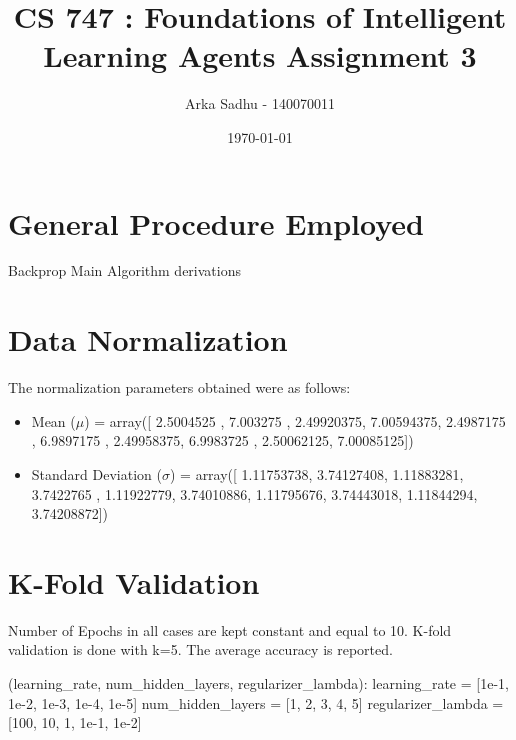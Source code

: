 \documentclass{article}
\title{CS 747 : Foundations of Intelligent Learning Agents Assignment 3}
\author{Arka Sadhu - 140070011}
\date{\today}
\begin{document}
\maketitle

\section{General Procedure Employed}
Backprop Main Algorithm derivations

\section{Data Normalization}
The normalization parameters obtained were as follows:
\begin{itemize}
\item Mean ($\mu$) = array([ 2.5004525 ,  7.003275  ,  2.49920375,  7.00594375,  2.4987175 , 6.9897175 ,  2.49958375,  6.9983725 ,  2.50062125,  7.00085125])
\item Standard Deviation ($\sigma$) = array([ 1.11753738,  3.74127408,  1.11883281,  3.7422765 ,  1.11922779,
  3.74010886,  1.11795676,  3.74443018,  1.11844294,  3.74208872])
\end{itemize}

\section{K-Fold Validation}
Number of Epochs in all cases are kept constant and equal to 10.
K-fold validation is done with k=5.
The average accuracy is reported.

(learning_rate, num_hidden_layers, regularizer_lambda):
learning_rate = [1e-1, 1e-2, 1e-3, 1e-4, 1e-5]
num_hidden_layers = [1, 2, 3, 4, 5]
regularizer_lambda = [100, 10, 1, 1e-1, 1e-2]
\end{document}
